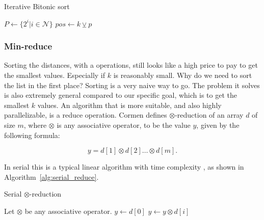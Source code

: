 \begin{algorithm}[ht]
\caption{Iterative Bitonic sort}
\label{alg:bitonic_sort}
\begin{algorithmic}
    \State $P \gets \{2^i|i \in \mathcal{N} \}$
            \ForAll{ $\{k \in P\ |\ k \in [p,0)\}$}
                \ForAll{$i \in [0,m)$}
                \State $pos \gets k \veebar p$ 
                     
                        \State {}
                    \EndIf
                        \State {}
                    \EndIf
                \EndIf
                \EndFor
            \EndFor
        \EndFor
    \EndFunction
    \Statex
    \State {}
    \EndIf
    \EndFunction
\end{algorithmic}
\end{algorithm}

\subsubsection{Min-reduce} %
\label{ssub:min_reduce}

Sorting the distances, with a  operations, still looks like a high price to pay to get the smallest values. Especially if $k$ is reasonably small. Why do we need to sort the list in the first place? Sorting is a very naive way to go. The problem it solves is also extremely general compared to our specific goal, which is to get the smallest $k$ values. An algorithm that is more suitable, and also highly parallelizable, is a reduce operation. Cormen\cite{Cormen:2001} defines $\otimes$-reduction of an array $d$ of size $m$, where $\otimes$ is any associative operator, to be the value $y$, given by the following formula:

     $$ y = d[1] \otimes d[2] \dots \otimes d[m].$$

In serial this is a typical linear algorithm with time complexity , as shown in Algorithm~\ref{alg:serial_reduce}. 

\begin{algorithm}[ht]
\caption{Serial $\otimes$-reduction}
\label{alg:serial_reduce}
\begin{algorithmic}
    \State Let $\otimes$ be any associative operator.
        \State $y \gets d[0]$
            \State $y \gets y \otimes d[i]$
        \EndFor
    \EndFunction
\end{algorithmic}
\end{algorithm}

